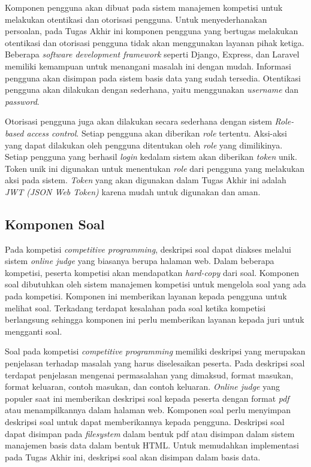 \par Komponen pengguna akan dibuat pada sistem manajemen kompetisi untuk melakukan otentikasi dan otorisasi pengguna. Untuk menyederhanakan persoalan, pada Tugas Akhir ini komponen pengguna yang bertugas melakukan otentikasi dan otorisasi pengguna tidak akan menggunakan layanan pihak ketiga. Beberapa \textit{software development framework} seperti Django, Express, dan Laravel memiliki kemampuan untuk menangani masalah ini dengan mudah. Informasi pengguna akan disimpan pada sistem basis data yang sudah tersedia. Otentikasi pengguna akan dilakukan dengan sederhana, yaitu menggunakan \textit{username} dan \textit{password}.

\par Otorisasi pengguna juga akan dilakukan secara sederhana dengan sistem \textit{Role-based access control}. Setiap pengguna akan diberikan \textit{role} tertentu. Aksi-aksi yang dapat dilakukan oleh pengguna ditentukan oleh \textit{role} yang dimilikinya. Setiap pengguna yang berhasil \textit{login} kedalam sistem akan diberikan \textit{token} unik. Token unik ini digunakan untuk menentukan \textit{role} dari pengguna yang melakukan aksi pada sistem. \textit{Token} yang akan digunakan dalam Tugas Akhir ini adalah \textit{JWT (JSON Web Token)} karena mudah untuk digunakan dan aman.

\subsection{Komponen Soal}

\par Pada kompetisi \textit{competitive programming}, deskripsi soal dapat diakses melalui sistem \textit{online judge} yang biasanya berupa halaman web. Dalam beberapa kompetisi, peserta kompetisi akan mendapatkan \textit{hard-copy} dari soal. Komponen soal dibutuhkan oleh sistem manajemen kompetisi untuk mengelola soal yang ada pada kompetisi. Komponen ini memberikan layanan kepada pengguna untuk melihat soal. Terkadang terdapat kesalahan pada soal ketika kompetisi berlangsung sehingga komponen ini perlu memberikan layanan kepada juri untuk mengganti soal.

\par Soal pada kompetisi \textit{competitive programming} memiliki deskripsi yang merupakan penjelasan terhadap masalah yang harus diselesaikan peserta. Pada deskripsi soal terdapat penjelasan mengenai permasalahan yang dimaksud, format masukan, format keluaran, contoh masukan, dan contoh keluaran. \textit{Online judge} yang populer saat ini memberikan deskripsi soal kepada peserta dengan format \textit{pdf} atau menampilkannya dalam halaman web. Komponen soal perlu menyimpan deskripsi soal untuk dapat memberikannya kepada pengguna. Deskripsi soal dapat disimpan pada \textit{filesystem} dalam bentuk pdf atau disimpan dalam sistem manajemen basis data dalam bentuk HTML. Untuk memudahkan implementasi pada Tugas Akhir ini, deskripsi soal akan disimpan dalam basis data.

